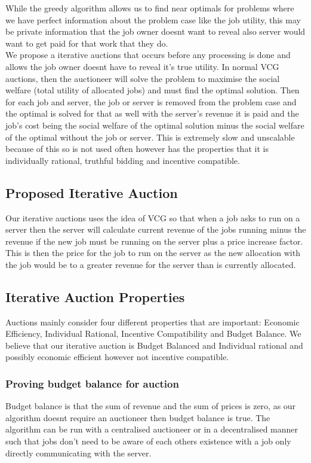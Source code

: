 \usepackage{graphicx}

While the greedy algorithm allows us to find near optimals for problems where we have perfect information about the
problem case like the job utility, this may be private information that the job owner doesnt want to reveal also
server would want to get paid for that work that they do. \\
We propose a iterative auctions that occurs before any processing is done and allows the job owner doesnt have to reveal
it's true utility. In normal VCG auctions, then the auctioneer will solve the problem to maximise the social welfare
(total utility of allocated jobs) and
must find the optimal solution. Then for each job and server, the job or server is removed from the problem case and the
optimal is solved for that as well with the server's revenue it is paid and the job's cost being the social welfare of
the optimal solution minus the social welfare of the optimal without the job or server. This is extremely slow and
unscalable because of this so is not used often however has the properties that it is individually rational, truthful
bidding and incentive compatible. \\

\subsection{Proposed Iterative Auction}\label{subsec:proposed-iterative-auction}
Our iterative auctions uses the idea of VCG so that when a job asks to run on a server then the server will calculate
current revenue of the jobs running minus the revenue if the new job must be running on the server plus a price increase
factor. This is then the price for the job to run on the server as the new allocation with the job would be to a greater
revenue for the server than is currently allocated.

\subsection{Iterative Auction Properties}\label{subsec:iterative-auction-properties}
Auctions mainly consider four different properties that are important: Economic Efficiency, Individual Rational,
Incentive Compatibility and Budget Balance. We believe that our iterative auction is Budget Balanced and Individual rational
and possibly economic efficient however not incentive compatible. \\

\subsubsection{Proving budget balance for auction}
Budget balance is that the sum of revenue and the sum of prices is zero, as our algorithm doesnt require an auctioneer
then budget balance is true. The algorithm can be run with a centralised auctioneer or in a decentralised manner such that
jobs don't need to be aware of each others existence with a job only directly communicating with the server.
